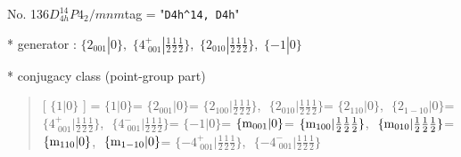 \documentclass[fleqn,10pt,landscape]{jsarticle}
\begin{document}
\newpage

No. 136\quad$D_{4h}^{14}$\quad$P4_2/mnm$\quad[ tetragonal ]
tag = "{\tt D4h^14, D4h}"

* generator : $\{2{}_{001}|0\},\,\,\{4^{+}_{\,\,001}|\frac{1}{2} \frac{1}{2} \frac{1}{2}\},\,\,\{2{}_{010}|\frac{1}{2} \frac{1}{2} \frac{1}{2}\},\,\,\{-1|0\}$

* conjugacy class (point-group part)
\begin{quote}
[ $\{1|0\}$ ] = \quad $\{1|0\}$\newline[ $\{2{}_{001}|0\}$ ] = \quad $\{2{}_{001}|0\}$ = \quad $\{2{}_{100}|\frac{1}{2} \frac{1}{2} \frac{1}{2}\}$,\,\, $\{2{}_{010}|\frac{1}{2} \frac{1}{2} \frac{1}{2}\}$\newline[ $\{2{}_{110}|0\}$ ] = \quad $\{2{}_{110}|0\}$,\,\, $\{2{}_{1-10}|0\}$ = \quad $\{4^{+}_{\,\,001}|\frac{1}{2} \frac{1}{2} \frac{1}{2}\}$,\,\, $\{4^{-}_{\,\,001}|\frac{1}{2} \frac{1}{2} \frac{1}{2}\}$\newline[ $\{-1|0\}$ ] = \quad $\{-1|0\}$\newline[ $\{{\rm m}_{001}|0\}$ ] = \quad $\{{\rm m}_{001}|0\}$ = \quad $\{{\rm m}_{100}|\frac{1}{2} \frac{1}{2} \frac{1}{2}\}$,\,\, $\{{\rm m}_{010}|\frac{1}{2} \frac{1}{2} \frac{1}{2}\}$\newline[ $\{{\rm m}_{110}|0\}$ ] = \quad $\{{\rm m}_{110}|0\}$,\,\, $\{{\rm m}_{1-10}|0\}$ = \quad $\{-4^{+}_{\,\,001}|\frac{1}{2} \frac{1}{2} \frac{1}{2}\}$,\,\, $\{-4^{-}_{\,\,001}|\frac{1}{2} \frac{1}{2} \frac{1}{2}\}$\newline
\end{quote}
\end{document}
